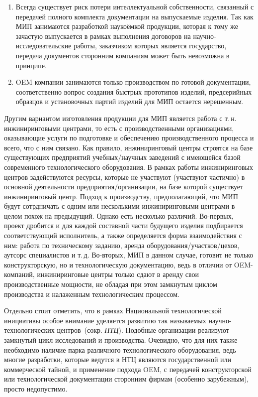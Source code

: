 \begin{enumerate}
	\item Всегда существует риск потери интеллектуальной собственности, связанный с передачей полного комплекта документации на выпускаемые изделия. Так как МИП занимаются разработкой наукоёмкой продукции, которая к тому же зачастую выпускается в рамках выполнения договоров на научно-исследовательские работы, заказчиком которых является государство, передача документов сторонним компаниям может быть невозможна в принципе.
	\item OEM компании занимаются только производством по готовой документации, соответственно вопрос создания быстрых прототипов изделий, предсерийных образцов и установочных партий изделий для МИП остается нерешенным.
\end{enumerate}


Другим вариантом изготовления продукции для МИП является работа с т.\,н. инжиниринговыми центрами, то есть с производственными организациями, оказывающие услуги по подготовке и обеспечению производственного процесса и всего, что с ним связано. Как правило, инжиниринговый центры строятся на базе существующих предприятий учебных/научных заведений с имеющейся базой современного технологического оборудования. В рамках работы инжиниринговых центров задействуются ресурсы, которые не участвуют (участвуют частично) в основной деятельности предприятия/организации, на базе которой существует инжиниринговый центр. Подход к производству, предполагающий, что МИП будут сотрдничать с одним или несколькими инжиниринговыми центрами в целом похож на предыдущий. Однако есть несколько различий. Во-первых, проект дробится и для каждой составной части будущего изделия подбирается соответствующий исполнитель, а также определяется форма взаимодействия с ним: работа по техническому заданию, аренда оборудования/участков/цехов, аутсорс специалистов и т.\,д. Во-вторых, МИП в данном случае, готовит не только конструкторскую, но и технологическую документацию, ведь в отличии от OEM-компаний, инжиниринговые центры только сдают в аренду свои производственные мощности, не обладая при этом замкнутым циклом производства и налаженным технологическим процессом.

Отдельно стоит отметить, что в рамках Национальной технологической инициативы особое внимание уделяется развитию так называемых научно-технологических центров~(сокр. \textit{НТЦ}). Подобные организации реализуют замкнутый цикл исследований и производства. Очевидно, что для них также необходимо наличие парка различного технологического оборудования, ведь многие разработки, которые ведутся в НТЦ являются государственной или коммерческой тайной, и применение подхода OEM, с передачей конструкторской или технологической документации сторонним фирмам (особенно зарубежным), просто недопустимо. 

